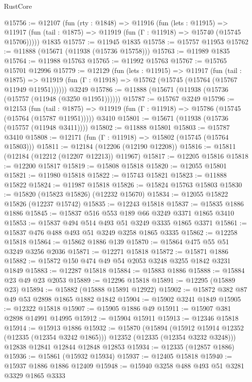 \begin{lexlean}{RustCore}
\begin{coremodule}
@15756 := @12107
    (fun (rty : @1848) =>
    @11916
      (fun (lets : @11915) =>
      @11917 (fun (tail : @1875) => @11919 (fun (Γ : @11918) => @15740 (@15745 @15706)))))
    @1835
@15757 := @11945 @1835
@15758 := @15757 @11953
@15762 := @11888 (@15671 (@11938 (@15736 @15758)))
@15763 := @11989 @1835
@15764 := @11988 @15763
@15765 := @11992 @15763
@15767 := @15765 @15701 @12996
@15779 := @12129
    (fun (lets : @11915) =>
    @11917
      (fun (tail : @1875) =>
      @11919 (fun (Γ : @11918) => @15762 (@15745 (@15764 (@15767 @11949 @11951))))))
    @3249
@15786 := @11888 (@15671 (@11938 (@15736 (@15757 (@11948 (@3250 @11951))))))
@15787 := @15767 @3249
@15796 := @12153
    (fun (tail : @1875) => @11919 (fun (Γ : @11918) => @15786 (@15745 (@15764 (@15787 @11951)))))
    @3410
@15801 := @15671 (@11938 (@15736 (@15757 (@11948 @3411))))
@15802 := @11888 @15801
@15803 := @15787 @3410
@15808 := @12171 (fun (Γ : @11918) => @15802 (@15745 (@15764 @15803)))
@15811 := @12184 (@12206 (@12190 @12208))
@15816 := @15811 (@12184 (@12212 (@12207 @12213)) @11967)
@15817 := @12205 @15816
@15818 := @12200 @15817
@15819 := @15808 @15818
@15820 := @12055 @15801
@15821 := @11980 @15818
@15822 := @15743 @15821
@15823 := @11888 @15822
@15824 := @11987 @15818
@15826 := @15824 @15763 @15803
@15830 := @15820 (@15823 @15826) (@12232 @15670)
@15834 := @12055 @15822 @15826 (@12237 @15742)
@15835 := @12243 @15818
@15837 := @15835 @1886 @1886
@15845 := @15837 @516 @553 @189 @66 @3249 @3371 @1865 @3410
@15853 := @15837 @494 @514 @493 @51 @3249 @3335 @1865 @3371
@15861 := @15837 @476 @488 @493 @51 @3249 @3258 @1865 @3335
@15862 := @12258 @15818
@15864 := @15862 @1886 @139
@15870 := @15864 @475 @55 @51 @3249 @3256 @2036
@15871 := @12271 @15818
@15872 := @15871 @1886
@15882 := @15872 @150 @474 @49 @54 @2053 @3248 @3255 @1842 @3231 @1849
@15883 := @12287 @15818
@15884 := @15883 @1886
@15888 := @15884 @23 @49 @23 @2053
@15889 := @12296 @15818
@15891 := @12295 (@15889 @23)
@15894 := @15882 (@15888 @15891 @12922)
@15902 := @15872 @382 @87 @49 @53 @2898 @1865 @1882 @1842
@15904 := @15902 @3241 @1849
@15905 := @12322 @15818
@15907 := @15905 @1886 @49
@15911 := @15907 @381 @2898 @14991 @14995
@15912 := @15904 @15911
@15913 := @12346 @15818
@15914 := @15913 @1886
@15932 := @15870
    (@15894
      (@15912 @15914 @12352 (@12335 (@12354 @3242 @1865)))
      @12352
      (@12335 (@12354 @3232 @3248)))
    @12838
    @12841
    @12844
    @12848
    @12853
@15934 := @12335 (@12857 @1886)
@15936 := @15861 (@15932 @15934)
@15937 := @12405 @15818
@15940 := @15937 @1886 @1886 @12409
@15948 := @15940 @3258 @488 @493 @51 @3281 @3329 @1865 @3333

\end{coremodule}
\end{lexlean}
